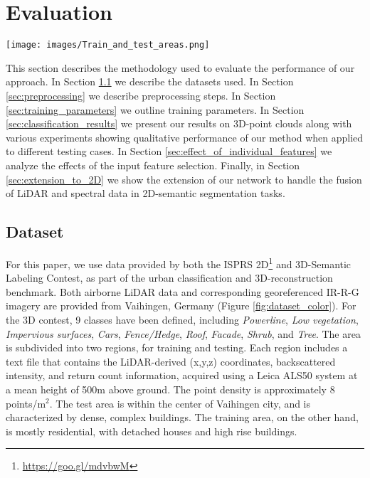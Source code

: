 \documentclass[final,3p,times,twocolumn,authoryear]{elsarticle}
\begin{document}
\section{Evaluation}
\label{sec:evaluation}
\begin{figure*}[th]
\begin{center}
\texttt{[image: images/Train\_and\_test\_areas.png]}
\end{center}
\caption{From left to right: point cloud (a) color-coded by height, and (b) by spectral information (IR,R,G) for the test area; and point cloud (c) color-coded by height, and (d) by spectral information (IR,R,G) for the training data.}
\label{fig:dataset_color}
\end{figure*}
This section describes the methodology used to evaluate the performance of our approach. 
In Section \ref{sec:dataset} we describe the datasets used. 
In Section \ref{sec:preprocessing} we describe preprocessing steps. 
In Section \ref{sec:training_parameters} we outline training parameters. 
In Section \ref{sec:classification_results} we present our results on 3D-point clouds along with various experiments showing qualitative performance of our method when applied to different testing cases. 
In Section \ref{sec:effect_of_individual_features} we analyze the effects of the input feature selection. 
Finally, in Section \ref{sec:extension_to_2D} we show the extension of our network to handle the fusion of LiDAR and spectral data in 2D-semantic segmentation tasks.
\subsection{Dataset}
\label{sec:dataset}
For this paper, we use data provided by both the ISPRS 2D\footnote{\url{https://goo.gl/mdvbwM}} and 3D-Semantic Labeling Contest, as part of the urban classification and 3D-reconstruction benchmark.
Both airborne LiDAR data and corresponding georeferenced IR-R-G imagery are provided from Vaihingen, Germany (Figure \ref{fig:dataset_color}).
For the 3D contest, 9 classes have been defined, including {\it Powerline}, {\it Low vegetation}, {\it Impervious surfaces}, {\it Cars}, {\it Fence/Hedge}, {\it Roof}, {\it Facade}, {\it Shrub}, and {\it Tree}. 
The area is subdivided into two regions, for training and testing. 
Each region includes a text file that contains the LiDAR-derived (x,y,z) coordinates, backscattered intensity, and return count information, acquired using a Leica ALS50 system at a mean height of 500m above ground. 
The point density is approximately 8 points/m$^{2}$. 
The test area is within the center of Vaihingen city, and is characterized by dense, complex buildings. 
The training area, on the other hand, is mostly residential, with detached houses and high rise buildings. 
\end{document}
